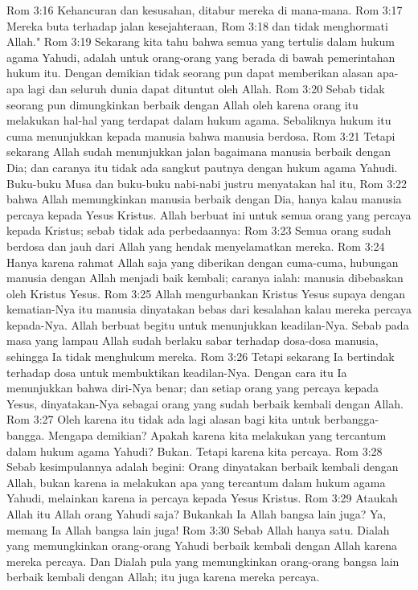 Rom 3:16  Kehancuran dan kesusahan, ditabur mereka di mana-mana.
Rom 3:17  Mereka buta terhadap jalan kesejahteraan,
Rom 3:18  dan tidak menghormati Allah."
Rom 3:19  Sekarang kita tahu bahwa semua yang tertulis dalam hukum agama Yahudi, adalah untuk orang-orang yang berada di bawah pemerintahan hukum itu. Dengan demikian tidak seorang pun dapat memberikan alasan apa-apa lagi dan seluruh dunia dapat dituntut oleh Allah.
Rom 3:20  Sebab tidak seorang pun dimungkinkan berbaik dengan Allah oleh karena orang itu melakukan hal-hal yang terdapat dalam hukum agama. Sebaliknya hukum itu cuma menunjukkan kepada manusia bahwa manusia berdosa.
Rom 3:21  Tetapi sekarang Allah sudah menunjukkan jalan bagaimana manusia berbaik dengan Dia; dan caranya itu tidak ada sangkut pautnya dengan hukum agama Yahudi. Buku-buku Musa dan buku-buku nabi-nabi justru menyatakan hal itu,
Rom 3:22  bahwa Allah memungkinkan manusia berbaik dengan Dia, hanya kalau manusia percaya kepada Yesus Kristus. Allah berbuat ini untuk semua orang yang percaya kepada Kristus; sebab tidak ada perbedaannya:
Rom 3:23  Semua orang sudah berdosa dan jauh dari Allah yang hendak menyelamatkan mereka.
Rom 3:24  Hanya karena rahmat Allah saja yang diberikan dengan cuma-cuma, hubungan manusia dengan Allah menjadi baik kembali; caranya ialah: manusia dibebaskan oleh Kristus Yesus.
Rom 3:25  Allah mengurbankan Kristus Yesus supaya dengan kematian-Nya itu manusia dinyatakan bebas dari kesalahan kalau mereka percaya kepada-Nya. Allah berbuat begitu untuk menunjukkan keadilan-Nya. Sebab pada masa yang lampau Allah sudah berlaku sabar terhadap dosa-dosa manusia, sehingga Ia tidak menghukum mereka.
Rom 3:26  Tetapi sekarang Ia bertindak terhadap dosa untuk membuktikan keadilan-Nya. Dengan cara itu Ia menunjukkan bahwa diri-Nya benar; dan setiap orang yang percaya kepada Yesus, dinyatakan-Nya sebagai orang yang sudah berbaik kembali dengan Allah.
Rom 3:27  Oleh karena itu tidak ada lagi alasan bagi kita untuk berbangga-bangga. Mengapa demikian? Apakah karena kita melakukan yang tercantum dalam hukum agama Yahudi? Bukan. Tetapi karena kita percaya.
Rom 3:28  Sebab kesimpulannya adalah begini: Orang dinyatakan berbaik kembali dengan Allah, bukan karena ia melakukan apa yang tercantum dalam hukum agama Yahudi, melainkan karena ia percaya kepada Yesus Kristus.
Rom 3:29  Ataukah Allah itu Allah orang Yahudi saja? Bukankah Ia Allah bangsa lain juga? Ya, memang Ia Allah bangsa lain juga!
Rom 3:30  Sebab Allah hanya satu. Dialah yang memungkinkan orang-orang Yahudi berbaik kembali dengan Allah karena mereka percaya. Dan Dialah pula yang memungkinkan orang-orang bangsa lain berbaik kembali dengan Allah; itu juga karena mereka percaya.
